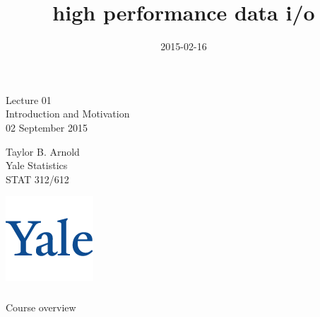   

\title{high performance data i/o}
\date{2015-02-16}



\begin{frame}[fragile] \frametitle{}

\vfill

{\fontsize{0.7cm}{0cm}\selectfont Lecture 01 \\\vspace{0.2cm} Introduction and Motivation}\\\vspace{0.5cm}
02 September 2015

\vspace{2cm}

\begin{minipage}{0.6\textwidth}
Taylor B. Arnold \\
Yale Statistics \\
STAT 312/612
\end{minipage}
\hfill
\begin{minipage}{0.3\textwidth}\raggedleft
\includegraphics[scale=0.3]{../yale-logo.png}
\end{minipage}%

\end{frame}

\begin{frame}[fragile] \frametitle{}

\begin{flushright}
{\color{yaleblue}\sc\fontsize{1cm}{0cm}\selectfont Course overview}
\end{flushright}


\end{frame}




